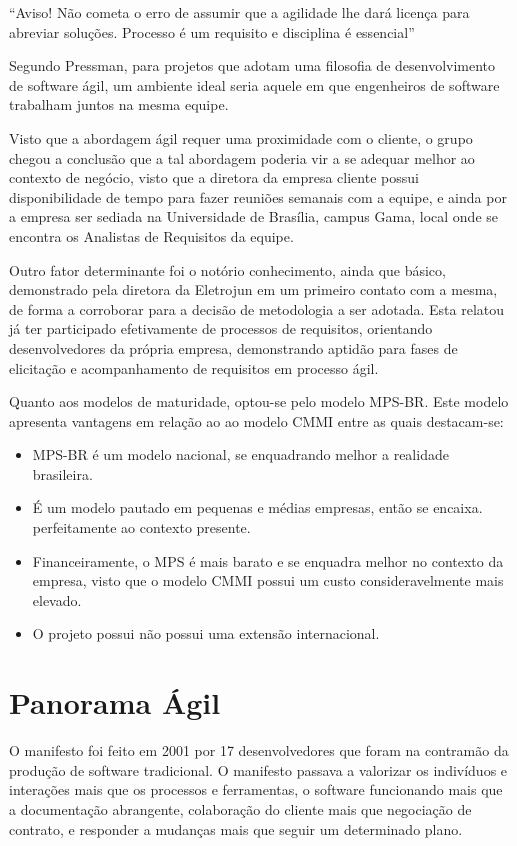 “Aviso! Não cometa o erro de assumir que a agilidade lhe dará licença para abreviar soluções. Processo é um requisito e disciplina é essencial” \cite {pressman}

Segundo Pressman, para projetos que adotam uma filosofia de desenvolvimento de software ágil, um ambiente ideal seria aquele em que engenheiros de software trabalham juntos na mesma equipe.

Visto que a abordagem ágil requer uma proximidade com o cliente, o grupo chegou a conclusão que a tal abordagem poderia vir a se adequar melhor ao contexto de negócio, visto que a diretora da empresa cliente possui disponibilidade de tempo para fazer reuniões semanais com a equipe, e ainda por a empresa ser sediada na Universidade de Brasília, campus Gama, local onde se encontra os Analistas de Requisitos da equipe.

Outro fator determinante foi o notório conhecimento, ainda que básico, demonstrado pela diretora da Eletrojun em um primeiro contato com a mesma, de forma a corroborar para a decisão de metodologia a ser adotada. Esta relatou já ter participado efetivamente de processos de requisitos, orientando desenvolvedores da própria empresa, demonstrando aptidão para fases de elicitação e acompanhamento de requisitos em processo ágil.

Quanto aos modelos de maturidade, optou-se pelo modelo MPS-BR. Este modelo apresenta vantagens em relação ao ao modelo CMMI entre as quais destacam-se:

\begin{itemize}
\item MPS-BR é um modelo nacional, se enquadrando melhor a realidade brasileira.
\item É um modelo pautado em pequenas e médias empresas, então se encaixa. perfeitamente ao contexto presente.
\item Financeiramente, o MPS é mais barato e se enquadra melhor no contexto da empresa, visto que o modelo CMMI possui um custo consideravelmente mais elevado.
\item O projeto possui não possui uma extensão internacional.
\end{itemize}

\section {Panorama Ágil}

O manifesto foi feito em 2001 por 17 desenvolvedores que foram na contramão da produção de software tradicional. O manifesto passava a valorizar os indivíduos e interações mais que os processos e ferramentas, o software funcionando mais que a documentação abrangente, colaboração do cliente mais que negociação de contrato, e responder a mudanças mais que seguir um determinado plano.

